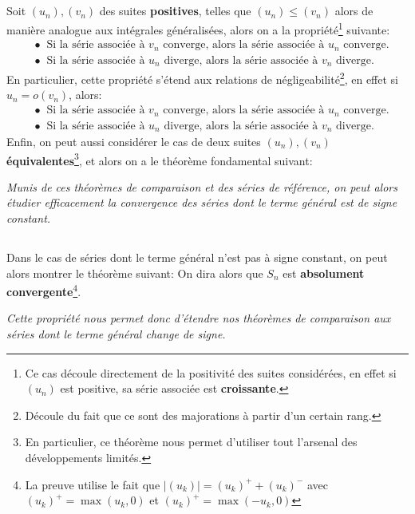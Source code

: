 \subsection*{}
Soit \((u_n),(v_n)\) des suites \textbf{positives}, telles que \((u_n) \leq (v_n)\) alors de manière analogue aux intégrales généralisées, alors on a la propriété\footnote[1]{Ce cas découle directement de la positivité des suites considérées, en effet si \((u_n)\) est positive, sa série associée est \textbf{croissante}.} suivante:
\begin{align*}
   &\bullet \;\; \text{Si la série associée à \(v_n\) converge, alors la série associée à \(u_n\) converge.} \\
   &\bullet \;\; \text{Si la série associée à \(u_n\) diverge, alors la série associée à \(v_n\) diverge.}
\end{align*}
En particulier, cette propriété s'étend aux relations de négligeabilité\footnote[2]{Découle du fait que ce sont des majorations à partir d'un certain rang.}, en effet si \(u_n = o(v_n)\), alors:
\begin{align*}
   &\bullet \;\; \text{Si la série associée à \(v_n\) converge, alors la série associée à \(u_n\) converge.} \\
   &\bullet \;\; \text{Si la série associée à \(u_n\) diverge, alors la série associée à \(v_n\) diverge.}
\end{align*}
Enfin, on peut aussi considérer le cas de deux suites \((u_n), (v_n)\) \textbf{équivalentes}\footnote[3]{En particulier, ce théorème nous permet d'utiliser tout l'arsenal des développements limités.}, et alors on a le théorème fondamental suivant:
\begin{center}
   \textit{Munis de ces théorèmes de comparaison et des séries de référence, on peut alors étudier efficacement la convergence des séries dont le terme général est de signe constant.}
\end{center}
\subsection*{}
Dans le cas de séries dont le terme général n'est pas à signe constant, on peut alors montrer le théorème suivant:
On dira alors que \(S_n\) est \textbf{absolument convergente}\footnote[4]{La preuve utilise le fait que \(|(u_k)| = (u_k)^+ + (u_k)^-\) avec \((u_k)^+ = \max(u_k, 0)\) et \((u_k)^+ = \max(-u_k, 0)\)}.
\begin{center}
   \textit{Cette propriété nous permet donc d'étendre nos théorèmes de comparaison aux séries dont le terme général change de signe.}
\end{center}
